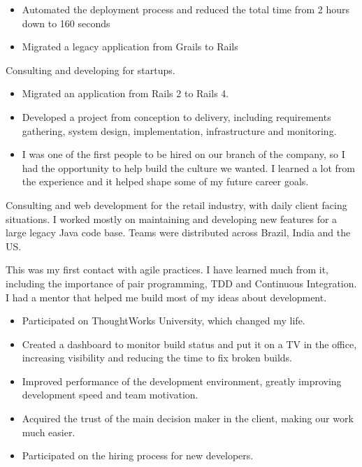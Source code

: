 \documentclass[10pt,a4paper,ragged2e,withhyper]{altacv}
\begin{document}
\begin{paracol}{2}
{\begin{itemize}
\item Automated the deployment process and reduced the total time from 2 hours down to 160 seconds
\item Migrated a legacy application from Grails to Rails
\end{itemize}
}

\divider


{\RaggedRight
Consulting and developing for startups.

\begin{itemize}
\item Migrated an application from Rails 2 to Rails 4.
\item Developed a project from conception to delivery, including requirements gathering, system design, implementation, infrastructure and monitoring.
\item I was one of the first people to be hired on our branch of the company, so I had the opportunity to help build the culture we wanted. I learned a lot from the experience and it helped shape some of my future career goals.
\end{itemize}
}

\divider


{\RaggedRight
Consulting and web development for the retail industry, with daily client facing situations. I worked mostly on maintaining and developing new features for a large legacy Java code base. Teams were distributed across Brazil, India and the US.

This was my first contact with agile practices. I have learned much from it, including the importance of pair programming, TDD and Continuous Integration. I had a mentor that helped me build most of my ideas about development.

\begin{itemize}
\item Participated on ThoughtWorks University, which changed my life.
\item Created a dashboard to monitor build status and put it on a TV in the office, increasing visibility and reducing the time to fix broken builds.
\item Improved performance of the development environment, greatly improving development speed and team motivation.
\item Acquired the trust of the main decision maker in the client, making our work much easier.
\item Participated on the hiring process for new developers.
\end{itemize}
}


\end{paracol}
\end{document}
